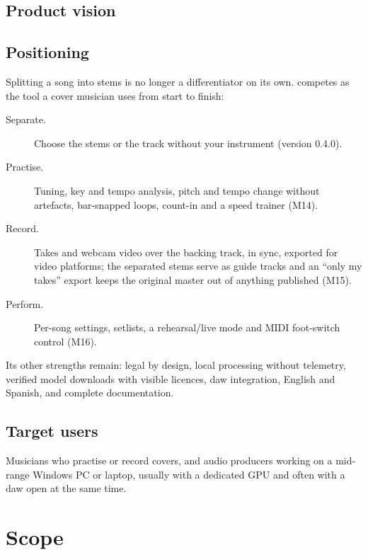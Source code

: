 \documentclass{covermaker}
\begin{document}
\section{Product vision}

\section{Positioning}\label{sec:positioning}
Splitting a song into stems is no longer a differentiator on its own. \CM{}
competes as the tool a cover musician uses from start to finish:
\begin{description}
  \item[Separate.] Choose the stems or the track without your instrument
        (version 0.4.0).
  \item[Practise.] Tuning, key and tempo analysis, pitch and tempo change
        without artefacts, bar-snapped loops, count-in and a speed trainer (M14).
  \item[Record.] Takes and webcam video over the backing track, in sync,
        exported for video platforms; the separated stems serve as guide
        tracks and an ``only my takes'' export keeps the original master out of
        anything published (M15).
  \item[Perform.] Per-song settings, setlists, a rehearsal/live mode and MIDI
        foot-switch control (M16).
\end{description}
Its other strengths remain: legal by design, local processing without
telemetry, verified model downloads with visible licences, \gls{daw}
integration, English and Spanish, and complete documentation.

\section{Target users}
Musicians who practise or record covers, and audio producers working on a
mid-range Windows PC or laptop, usually with a dedicated GPU and often with a
\gls{daw} open at the same time.

\chapter{Scope}
\end{document}
